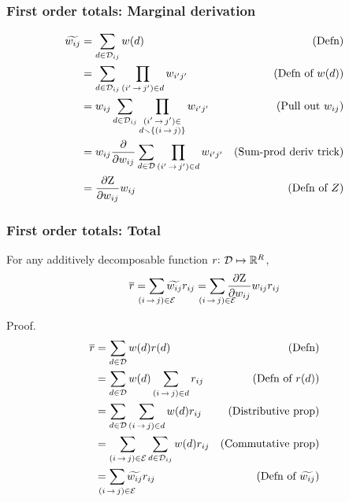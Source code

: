 \documentclass{beamer}
\begin{document}
\begin{frame}
\frametitle{First order totals: Marginal derivation}
\begin{align*}
    {\widetilde{w_{ij}}} &= \sum_{{d}\in{\mathcal{D}_{ij}}}{w({d})} & \textrm{(Defn)}\\
    &= \sum_{{d}\in{\mathcal{D}_{ij}}}\prod_{{(i'\,{\rightarrow}\,j')}\in{d}}{w_{i'j'}} & \textrm{(Defn of }{w({d})})\\
    &= {w_{ij}} \sum_{{d}\in{\mathcal{D}_{ij}}}
        \prod_{\substack{{(i'\,{\rightarrow}\,j')}\in \\{d}\smallsetminus \{{(i\,{\rightarrow}\,j)}\}}}{w_{i'j'}}
        & \textrm{(Pull out } {w_{ij}})\\
    &={w_{ij}} \frac{\partial}{\partial {w_{ij}}} \sum_{{d} \in {\mathcal{D}}}\prod_{{(i'\,{\rightarrow}\,j')}\in{d}} {w_{i'j'}}
        & \textrm{(Sum-prod deriv trick)}\\
    &= \frac{\partial {\mathrm{Z}}}{\partial {w_{ij}}} {w_{ij}} & \textrm{(Defn of }Z)
\end{align*}

\end{frame}

\begin{frame}
\frametitle{First order totals: Total}

For any additively decomposable function $r{:}\,\,{\mathcal{D}} \mapsto \mathbb{R}^{{R}}$,
\begin{equation}
    \rbar = \smashoperator{\sum_{\edgeij\in\edges}}\totalw{ij}\redge{ij}
        = \smashoperator{\sum_{\edgeij\in\edges}}\frac{\partial \wbar}{\partial \wedge{ij}}\wedge{ij}\redge{ij}
\end{equation}

Proof.
\begin{align*}
    \rbar &= \sumtree\wtree{\tree}\rtree{\tree}  & (\textrm{Defn})\\
    &= \sumtree\wtree{\tree}\sum_{\edgeij\in \tree} \redge{ij} & (\textrm{Defn of }r(d))\\
    &= \sumtree\sum_{\edgeij\in \tree}\wtree{\tree}\redge{ij} & (\textrm{Distributive prop})\\
    &= \sum_{\edgeij\in\edges}\sum_{\tree\in\inc{ij}}\wtree{\tree}\redge{ij} & (\textrm{Commutative prop})\\
    &= \smashoperator{\sum_{\edgeij\in\edges}}\totalw{ij}\redge{ij} & (\textrm{Defn of }\totalw{ij})
\end{align*}

\end{frame}
\end{document}
